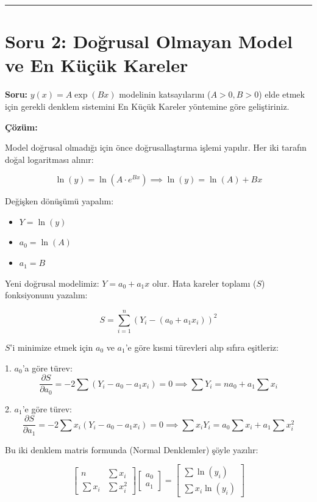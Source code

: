 \documentclass[a4paper,12pt]{article}
\begin{document}
\hrule
\vspace{0.5cm}

\section*{Soru 2: Doğrusal Olmayan Model ve En Küçük Kareler}

\textbf{Soru:} $y(x) = A \exp(Bx)$ modelinin katsayılarını ($A>0, B>0$) elde etmek için gerekli denklem sistemini En Küçük Kareler yöntemine göre geliştiriniz.

\textbf{Çözüm:}

Model doğrusal olmadığı için önce doğrusallaştırma işlemi yapılır. Her iki tarafın doğal logaritması alınır:

\[
\ln(y) = \ln(A \cdot e^{Bx}) \implies \ln(y) = \ln(A) + Bx
\]

Değişken dönüşümü yapalım:
\begin{itemize}
    \item $Y = \ln(y)$
    \item $a_0 = \ln(A)$
    \item $a_1 = B$
\end{itemize}

Yeni doğrusal modelimiz: $Y = a_0 + a_1 x$ olur. Hata kareler toplamı ($S$) fonksiyonunu yazalım:

\[
S = \sum_{i=1}^{n} \left( Y_i - (a_0 + a_1 x_i) \right)^2
\]

$S$'i minimize etmek için $a_0$ ve $a_1$'e göre kısmi türevleri alıp sıfıra eşitleriz:

1. $a_0$'a göre türev:
\[
\frac{\partial S}{\partial a_0} = -2 \sum (Y_i - a_0 - a_1 x_i) = 0 \implies \sum Y_i = n a_0 + a_1 \sum x_i
\]

2. $a_1$'e göre türev:
\[
\frac{\partial S}{\partial a_1} = -2 \sum x_i (Y_i - a_0 - a_1 x_i) = 0 \implies \sum x_i Y_i = a_0 \sum x_i + a_1 \sum x_i^2
\]

Bu iki denklem matris formunda (Normal Denklemler) şöyle yazılır:

\[
\begin{bmatrix}
n & \sum x_i \\
\sum x_i & \sum x_i^2
\end{bmatrix}
\begin{bmatrix}
a_0 \\
a_1
\end{bmatrix}
=
\begin{bmatrix}
\sum \ln(y_i) \\
\sum x_i \ln(y_i)
\end{bmatrix}
\]
\end{document}
